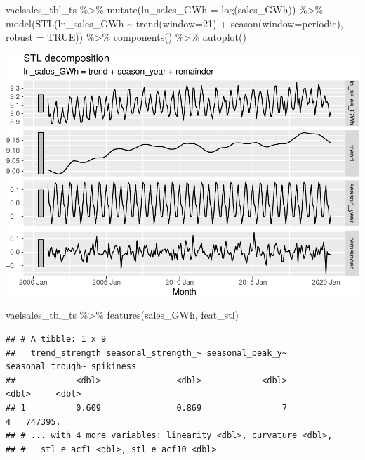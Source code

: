 \documentclass[
]{book}
\newenvironment{Shaded}{\begin{snugshade}}{\end{snugshade}}
\newcommand{\AttributeTok}[1]{\textcolor[rgb]{0.77,0.63,0.00}{#1}}
\newcommand{\ConstantTok}[1]{\textcolor[rgb]{0.00,0.00,0.00}{#1}}
\newcommand{\DecValTok}[1]{\textcolor[rgb]{0.00,0.00,0.81}{#1}}
\newcommand{\FunctionTok}[1]{\textcolor[rgb]{0.00,0.00,0.00}{#1}}
\newcommand{\NormalTok}[1]{#1}
\newcommand{\SpecialCharTok}[1]{\textcolor[rgb]{0.00,0.00,0.00}{#1}}
\newcommand{\StringTok}[1]{\textcolor[rgb]{0.31,0.60,0.02}{#1}}
\begin{document}
\begin{Shaded}
\begin{Highlighting}[]
\NormalTok{vaelsales\_tbl\_ts }\SpecialCharTok{\%\textgreater{}\%}
  \FunctionTok{mutate}\NormalTok{(}\AttributeTok{ln\_sales\_GWh =} \FunctionTok{log}\NormalTok{(sales\_GWh)) }\SpecialCharTok{\%\textgreater{}\%}
  \FunctionTok{model}\NormalTok{(}\FunctionTok{STL}\NormalTok{(ln\_sales\_GWh }\SpecialCharTok{\textasciitilde{}} \FunctionTok{trend}\NormalTok{(}\AttributeTok{window=}\DecValTok{21}\NormalTok{) }\SpecialCharTok{+} \FunctionTok{season}\NormalTok{(}\AttributeTok{window=}\StringTok{\textquotesingle{}periodic\textquotesingle{}}\NormalTok{),}
    \AttributeTok{robust =} \ConstantTok{TRUE}\NormalTok{)) }\SpecialCharTok{\%\textgreater{}\%}
  \FunctionTok{components}\NormalTok{() }\SpecialCharTok{\%\textgreater{}\%}
  \FunctionTok{autoplot}\NormalTok{()}
\end{Highlighting}
\end{Shaded}

\includegraphics{graphics/perform multiplicative STL decomposition of the VA electricity sales time series 2-1.pdf}

\begin{Shaded}
\begin{Highlighting}[]
\NormalTok{vaelsales\_tbl\_ts }\SpecialCharTok{\%\textgreater{}\%} \FunctionTok{features}\NormalTok{(sales\_GWh, feat\_stl)}
\end{Highlighting}
\end{Shaded}

\begin{verbatim}
## # A tibble: 1 x 9
##   trend_strength seasonal_strength_~ seasonal_peak_y~ seasonal_trough~ spikiness
##            <dbl>               <dbl>            <dbl>            <dbl>     <dbl>
## 1          0.609               0.869                7                4   747395.
## # ... with 4 more variables: linearity <dbl>, curvature <dbl>,
## #   stl_e_acf1 <dbl>, stl_e_acf10 <dbl>
\end{verbatim}
\end{document}
